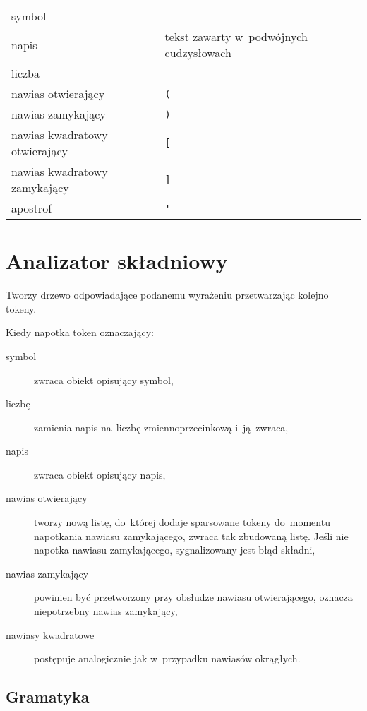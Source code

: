 \documentclass[a4paper,11pt]{article}
\begin{document}
\begin{table}[H]
  \centering
  \begin{tabular}{|p{6cm} p{6cm}|} \hline
    symbol & \\
    napis & tekst zawarty w~podwójnych cudzysłowach \\ 
    liczba & \\ \hline
    nawias otwierający & \verb+(+ \\
    nawias zamykający & \verb+)+ \\ \hline
    nawias kwadratowy otwierający & \verb+[+ \\
    nawias kwadratowy zamykający & \verb+]+ \\ \hline
    apostrof & \verb+'+ \\ \hline
  \end{tabular}
\end{table}

\section{Analizator składniowy}

Tworzy drzewo odpowiadające podanemu wyrażeniu przetwarzając kolejno tokeny.

Kiedy napotka token oznaczający:
\begin{description}
\item[symbol] zwraca obiekt opisujący symbol,
\item[liczbę] zamienia napis na~liczbę zmiennoprzecinkową i~ją~zwraca,
\item[napis] zwraca obiekt opisujący napis,
\item[nawias otwierający] tworzy nową listę, do~której dodaje sparsowane tokeny
  do~momentu napotkania nawiasu zamykającego, zwraca tak zbudowaną listę. Jeśli
  nie napotka nawiasu zamykającego, sygnalizowany jest błąd składni,
\item[nawias zamykający] powinien być przetworzony przy obsłudze nawiasu
  otwierającego, oznacza niepotrzebny nawias zamykający,
\item[nawiasy kwadratowe] postępuje analogicznie jak w~przypadku nawiasów
  okrągłych.
\end{description}

\subsection{Gramatyka}
\end{document}
